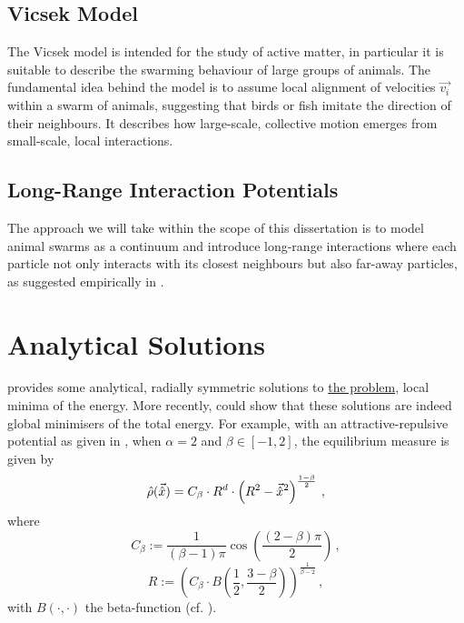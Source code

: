 \subsection{Vicsek Model}
The Vicsek model \parencite{1995-vicsek-model} is intended for the study of active matter, in particular it is suitable to describe the swarming behaviour of large groups of animals.
The fundamental idea behind the model is to assume local alignment of velocities $\vec{v_i}$ within a swarm of animals, suggesting that birds or fish imitate the direction of their neighbours.
It describes how large-scale, collective motion emerges from small-scale, local interactions.

\subsection{Long-Range Interaction Potentials}
The approach we will take within the scope of this dissertation is to model animal swarms as a continuum and introduce long-range interactions where each particle not only interacts with its closest neighbours but also far-away particles, as suggested empirically in \cite{2010-starlings}.

\section{Analytical Solutions}
\label{sec:analytical-solutions}
\cite{2017-explicit-solutions} provides some analytical, radially symmetric solutions to \hyperref[def:the-problem]{the problem}, local minima of the energy.
More recently, \cite{2021-carrillo-radial} could show that these solutions are indeed global minimisers of the total energy.
For example, with an attractive-repulsive potential as given in , when $\alpha = 2$ and $\beta \in [-1, 2]$, the equilibrium measure is given by
\begin{equation}
  \hat{\rho}(\vec{\hat{x}}) = C_\beta \cdot R^d \cdot \left(R^2 - \vec{\hat{x}}^2\right)^{\frac{1-\beta}{2}}\,,
  \label{eq:analytical-solution-alpha-equal-2}
\end{equation}
where
$$C_\beta := \frac{1}{(\beta - 1) \pi} \cos\left(\frac{(2 - \beta) \pi}{2}\right)\,,$$
$$R := \left(C_\beta \cdot B\left(\frac{1}{2}, \frac{3 - \beta}{2}\right)\right)^{\frac{1}{\beta - 2}}\,,$$
with $B(\cdot, \cdot)$ the beta-function (cf. ).
